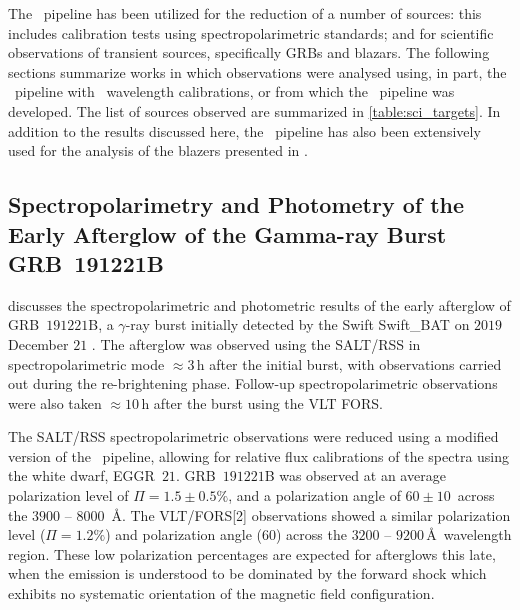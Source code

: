 The \stops\ pipeline has been utilized for the reduction of a number of sources: this includes calibration tests using spectropolarimetric standards; and for scientific observations of transient sources, specifically \glspl{GRB} and blazars.
The following sections summarize works in which observations were analysed using, in part, the \stops\ pipeline with \iraf\ wavelength calibrations, or from which the \stops\ pipeline was developed.
The list of sources observed are summarized in \autoref{table:sci_targets}.
In addition to the results discussed here, the \stops\ pipeline has also been extensively used for the analysis of the blazers presented in \citet{Barnard_HEASA2021, Barnard_2024}.



\subsection[Buckley et al.\ (2019)]{%
    Spectropolarimetry and Photometry of the Early Afterglow of the Gamma-ray Burst GRB~191221B\\
    \citep{Buckley191221B}
}

\citet{Buckley191221B} discusses the spectropolarimetric and photometric results of the early afterglow of GRB~$191221$B, a $\gamma$-ray burst initially detected by the \gls{Swift} \gls{Swift_BAT} \citep{swift_bat} on $2019$ December $21$ \citep{grb191221b}.
The afterglow was observed using the \gls{SALT}/\gls{RSS} in spectropolarimetric mode $\approx 3$\,h after the initial burst, with observations carried out during the re-brightening phase.
Follow-up spectropolarimetric observations were also taken $\approx 10$\,h after the burst using the \gls{VLT} \gls{FORS}.

The \gls{SALT}/\gls{RSS} spectropolarimetric observations were reduced using a modified version of the \polsalt\ pipeline, allowing for relative flux calibrations of the spectra using the white dwarf, EGGR~$21$.
GRB~$191221$B was observed at an average polarization level of $\Pi = 1.5 \pm 0.5\%$, and a polarization angle of $60 \pm 10$\degree\ across the $3900$ -- $8000$~\AA.
The \gls{VLT}/\gls{FORS}[2] observations showed a similar polarization level ($\Pi = 1.2\%$) and polarization angle ($60$\degree) across the $3200$ -- $9200$\,\AA\ wavelength region.
These low polarization percentages are expected for afterglows this late, when the emission is understood to be dominated by the forward shock which exhibits no systematic orientation of the magnetic field configuration.

